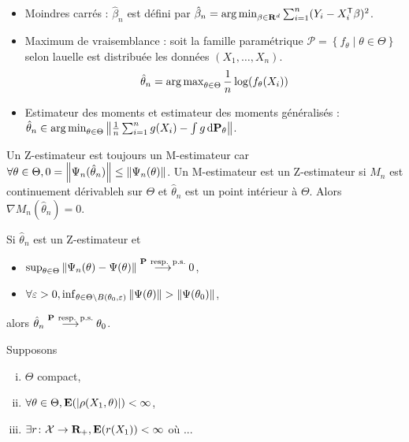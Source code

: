 	\begin{ex}
		\begin{itemize}
			\item[\textbullet] Moindres carrés : $\hat{\beta}_n$ est défini par $\hat{\beta}_n = \operatorname{arg\, min}_{\beta \in \mathbf{R}^d} \sum_{i = 1}^n (Y_i - X_i^\mathsf{T}\beta)^2$.
			\item[\textbullet] Maximum de vraisemblance : soit la famille paramétrique $\mathcal{P} = \left\{ f_{\theta} \mid \theta \in \Theta \right\}$ selon lauelle est distribuée les données $(X_1,\ldots,X_n)$.
				$$\hat{\theta}_n = \operatorname{arg\, max}_{\theta \in \Theta} \frac{1}{n} \log(f_{\theta}(X_i))$$
			\item[\textbullet] Estimateur des moments et estimateur des moments généralisés : $\hat{\theta}_n \in \operatorname{arg\, min}_{\theta \in \Theta} \left\lVert \frac{1}{n}\sum_{i = 1}^n g(X_i) - \int g \mathop{}\mathopen{}\mathrm{d} \mathbf{P}_\theta \right\rVert$.
		\end{itemize}
	\end{ex}

	\begin{rem}
		Un Z-estimateur est toujours un M-estimateur car $\forall \theta \in \Theta, 0 = \left\lVert\Psi_n(\hat{\theta}_n)\right\rVert \leq \left\lVert\Psi_n(\theta)\right\rVert$.
		Un M-estimateur est un Z-estimateur si $M_n$ est continuement dérivableh sur $\Theta$ et $\hat{\theta}_n$ est un point intérieur à $\Theta$.
		Alors $\nabla M_n(\hat{\theta}_n) = 0$.
	\end{rem}

	\begin{pop}[Consistance]
		
	\end{pop}

	\begin{pop}
		Si $\hat{\theta}_n$ est un Z-estimateur et
		\begin{itemize}
			\item[\textbullet] $\sup_{\theta \in \Theta} \left\lVert \Psi_n(\theta) - \Psi(\theta) \right\rVert \overset{\mathbf{P}\ \text{resp. p.s.}}{\longrightarrow} 0$,
			\item[\textbullet] $\forall \varepsilon > 0, \inf_{\theta \in \Theta \setminus B(\theta_0,\varepsilon)} \left\lVert\Psi(\theta)\right\rVert > \left\lVert\Psi(\theta_0)\right\rVert$,
		\end{itemize}
		alors $\hat{\theta}_n \overset{\proba\ \text{resp. p.s.}}{\longrightarrow} \theta_0$.
	\end{pop}

	\begin{lem}
		Supposons
		\begin{enumerate}[(i)]
			\item $\Theta$ compact,
			\item $\forall \theta \in \Theta, \mathbf{E}(\left\lvert\rho(X_1,\theta)\right\rvert) < \infty$,
			\item $\exists r \colon \mathcal{X} \to \mathbf{R}_+, \mathbf{E}(r(X_1)) < \infty$ où ...
		\end{enumerate}
	\end{lem}

